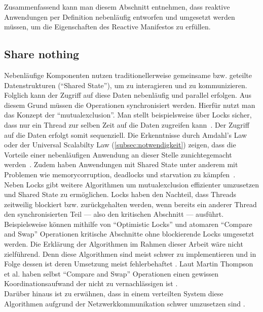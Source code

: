 Zusammenfassend kann man diesem Abschnitt entnehmen, dass reaktive Anwendungen per Definition nebenläufig entworfen und umgesetzt werden müssen, um die Eigenschaften des Reactive Manifestos zu erfüllen.

\pagebreak

\subsection{Share nothing}\label{subsec:sharenothing}
Nebenläufige Komponenten nutzen traditionellerweise gemeinsame bzw. geteilte Datenstrukturen (\enquote{Shared State}), um zu interagieren und zu kommunizieren. Folglich kann der Zugriff auf diese Daten nebenläufig und parallel erfolgen. Aus diesem Grund müssen die Operationen synchronisiert werden. Hierfür nutzt man das Konzept der \enquote{\gls{mutualexclusion}}. Man stellt beispielsweise über Locks sicher, dass nur ein Thread zur selben Zeit auf die Daten zugreifen kann~\cite[S.~10]{butcher_seven_2014}. Der Zugriff auf die Daten erfolgt somit sequenziell. Die Erkenntnisse durch Amdahl's Law oder der Universal Scalabilty Law (\ref{subsec:notwendigkeit}) zeigen, dass die Vorteile einer nebenläufigen Anwendung an dieser Stelle zunichtegemacht werden~\cite[S.~45]{kuhn_reactive_2015}. Zudem haben Anwendungen mit Shared State unter anderem mit Problemen wie \gls{memorycorruption}, \glspl{deadlock} und \gls{starvation} zu kämpfen~\cite[S.~117]{vernon_reactive_2016}.\\
Neben Locks gibt weitere Algorithmen um \gls{mutualexclusion} effizienter umzusetzen und Shared State zu ermöglichen. Locks haben den Nachteil, dass Threads zeitweilig blockiert bzw. zurückgehalten werden, wenn bereits ein anderer Thread den synchronisierten Teil --- also den kritischen Abschnitt --- ausführt. Beispielsweise können mithilfe von \enquote{Optimistic Locks} und atomaren \enquote{Compare and Swap} Operationen kritische Abschnitte ohne blockierende Locks umgesetzt werden. Die Erklärung der Algorithmen im Rahmen dieser Arbeit wäre nicht zielführend. Denn diese Algorithmen sind meist schwer zu implementieren und in Folge dessen ist deren Umsetzung meist fehlerbehaftet \cite{jenkov_non-blocking_2015}. Laut Martin Thompson et al. haben selbst \enquote{Compare and Swap} Operationen einen gewissen Koordinationsaufwand der nicht zu vernachlässigen ist \cite{thompson_disruptor_2011}.\\
Darüber hinaus ist zu erwähnen, dass in einem verteilten System diese Algorithmen aufgrund der Netzwerkkommunikation schwer umzusetzen sind \cite[S.~45]{butcher_seven_2014}.\\

